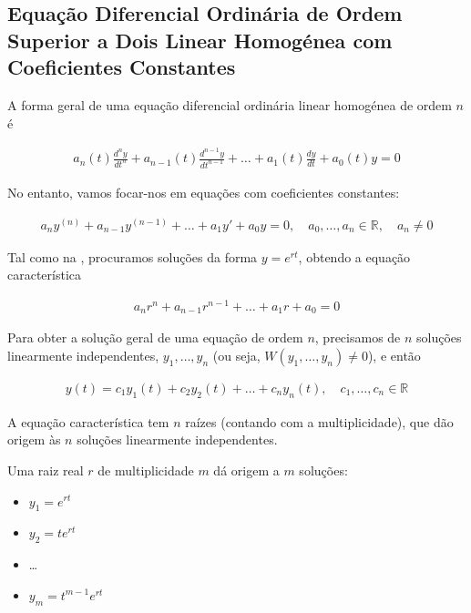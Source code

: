 \documentclass{article}
\begin{document}
\subsection{Equação Diferencial Ordinária de Ordem Superior a Dois Linear Homogénea com Coeficientes Constantes}
\label{subsec: edo-ordem-n-linear-homogenea-coef-constantes}

A forma geral de uma equação diferencial ordinária linear homogénea de ordem $n$ é

\begin{gather*}
a_n(t) \frac{d^n y}{dt^n} + a_{n-1}(t) \frac{d^{n-1} y}{dt^{n-1}} + \ldots + a_1(t) \frac{dy}{dt} + a_0(t) y = 0
\end{gather*}

No entanto, vamos focar-nos em equações com coeficientes constantes:

\begin{gather*}
\boxed{a_n y^{(n)} + a_{n-1} y^{(n-1)} + \ldots + a_1 y' + a_0 y = 0, \quad a_0, \ldots, a_n \in \mathbb{R}, \quad a_n \neq 0}
\end{gather*}

Tal como na , procuramos soluções da
forma $y = e^{rt}$, obtendo a equação característica

\begin{gather*}
a_n r^n + a_{n-1} r^{n-1} + \ldots + a_1 r + a_0 = 0
\end{gather*}

Para obter a solução geral de uma equação de ordem $n$, precisamos de $n$ soluções linearmente
independentes, $y_1, \ldots, y_n$ (ou seja, $W(y_1, \ldots, y_n) \neq 0$), e então

\begin{gather*}
\boxed{y(t) = c_1 y_1(t) + c_2 y_2(t) + \ldots + c_n y_n(t), \quad c_1, \ldots, c_n \in \mathbb{R}}
\end{gather*}

A equação característica tem $n$ raízes (contando com a multiplicidade), que dão origem às $n$ soluções
linearmente independentes.

\smallskip

Uma raiz real $r$ de multiplicidade $m$ dá origem a $m$ soluções:

\begin{itemize}
    \item $y_1 = e^{rt}$
    \item $y_2 = t e^{rt}$
    \item \ldots
    \item $y_m = t^{m-1} e^{rt}$
\end{itemize}
\end{document}
